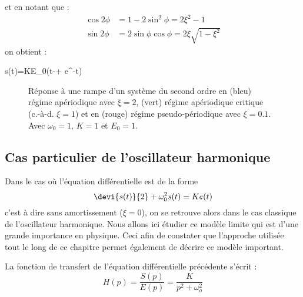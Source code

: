 et en notant que :
\begin{align*}
    \cos{2\phi}&=1-2\sin^2\phi=2\xi^2-1\\
    \sin{2\phi}&=2\sin\phi\cos\phi=2\xi\sqrt{1-\xi^2}
\end{align*}
on obtient :
\begin{bequation}
s(t)=KE_0\left(t-+
	     e^{-\alpha t}\right)
\end{bequation}
\begin{figure}[!t]
    \centering
    
    \caption{Réponse à une rampe d'un système du second ordre en 
            (bleu) régime apériodique avec $\xi=2$, 
            (vert) régime apériodique critique (c.-à-d. $\xi=1$) et en 
            (rouge) régime pseudo-périodique avec $\xi=0.1$. 
            Avec $\omega_0=1$, $K=1$ et $E_0=1$. \label{fig-2nd_ramp}}
\end{figure}
\subsection{Cas particulier de l'oscillateur harmonique}
Dans le cas où l'équation différentielle est de la forme 
\[
\devi{s(t)}{2}+\omega_0^2 s(t)=Ke(t)
\]
c'est à dire sans amortissement ($\xi=0$), on se retrouve alors dans le 
cas classique de l'oscillateur harmonique.
Nous allons ici étudier ce modèle limite qui est d'une grande importance 
en physique. Ceci afin de constater que l'approche utilisée tout le long de 
ce chapitre permet également de décrire ce modèle important. 

La fonction de transfert de l'équation différentielle précédente s'écrit :
\[
H(p)=\dfrac{S(p)}{E(p)}=\dfrac{K}{p^2+\omega_o^2}
\]
